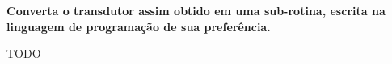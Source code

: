 
\textbf{Converta o transdutor assim obtido em uma sub-rotina, escrita na linguagem de programação de sua preferência.}

TODO
